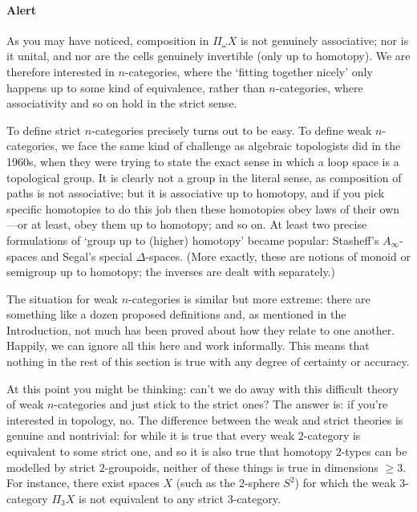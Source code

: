 \paragraph{Alert}%
%
%
As you may have noticed, composition in $\Pi_\omega X$
is not genuinely associative; nor is it unital, and nor are the cells
genuinely invertible%
%
%
(only up to homotopy).  We are therefore interested in
 $n$-categories, where the `fitting together nicely' only
happens up to some kind of equivalence, rather than 
$n$-categories, where associativity and so on hold in the strict sense.

To define strict $n$-categories precisely turns out to be easy.  To define
weak $n$-categories,%
%
%
we face the same kind of challenge as algebraic
topologists did in the 1960s, when they were trying to state the exact
sense in which a loop%
%
%
space is a topological group.%
%
%
 It is clearly not a group in the literal sense, as composition of paths is
not associative; but it is associative up to homotopy, and if you pick
specific homotopies to do this job then these homotopies obey laws of their
own---or at least, obey them up to homotopy; and so on.  At least two
precise formulations of `group up to (higher) homotopy' became popular:
Stasheff's%
%
%
$A_\infty$-spaces%
%
%
and Segal's%
%
%
special $\Delta$-spaces.%
%
%
%
%
%
%
 (More exactly,
these are notions of monoid or semigroup up to homotopy; the inverses%
%
%
are
dealt with separately.)

The situation for weak $n$-categories is similar but more extreme: there
are something like a dozen proposed definitions and, as mentioned in the
Introduction, not much has been proved about how they relate to one
another.  Happily, we can ignore all this here and work informally.  This
means that nothing in the rest of this section is true with any degree of
certainty or accuracy.

At this point you might be thinking: can't we do away with this difficult
theory of weak $n$-categories and just stick to the strict ones?  The
answer is: if you're interested in topology, no.  The difference between
the weak and strict theories is genuine and nontrivial: for while it is
true that every weak $2$-category is equivalent%
%
%
to some strict one, and so
it is also true that homotopy $2$-types%
%
%
can be modelled by strict
$2$-groupoids, neither of these things is true in dimensions $\geq 3$.  For
instance, there exist spaces $X$ (such as the 2-sphere%
%
%
$S^2$) for which the
weak $3$-category%
%
%
$\Pi_3 X$ is not equivalent%
%
%
to any strict $3$-category.

